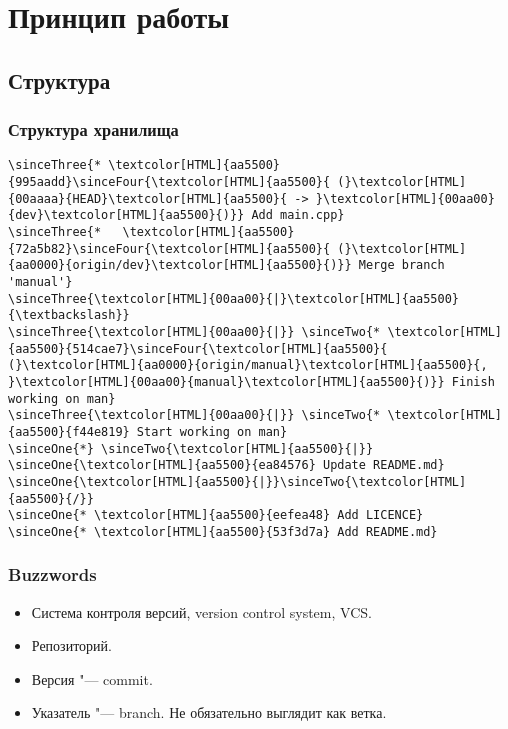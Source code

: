 \documentclass[pdf,russian]{beamer}
\begin{document}
\section{Принцип работы}

\subsection{Структура}

\begin{frame}[fragile]
    \frametitle{Структура хранилища}


    \newcommand{\sinceOne}[1]{\onslide<2->{#1}}
    \newcommand{\sinceTwo}[1]{\onslide<4->{#1}}
    \newcommand{\sinceThree}[1]{\onslide<6->{#1}}
    \newcommand{\sinceFour}[1]{\onslide<8->{#1}}

    \begin{block}{}
        \begin{Verbatim}[commandchars=\\\{\}]
\sinceThree{* \textcolor[HTML]{aa5500}{995aadd}\sinceFour{\textcolor[HTML]{aa5500}{ (}\textcolor[HTML]{00aaaa}{HEAD}\textcolor[HTML]{aa5500}{ -> }\textcolor[HTML]{00aa00}{dev}\textcolor[HTML]{aa5500}{)}} Add main.cpp}
\sinceThree{*   \textcolor[HTML]{aa5500}{72a5b82}\sinceFour{\textcolor[HTML]{aa5500}{ (}\textcolor[HTML]{aa0000}{origin/dev}\textcolor[HTML]{aa5500}{)}} Merge branch 'manual'}
\sinceThree{\textcolor[HTML]{00aa00}{|}\textcolor[HTML]{aa5500}{\textbackslash}}
\sinceThree{\textcolor[HTML]{00aa00}{|}} \sinceTwo{* \textcolor[HTML]{aa5500}{514cae7}\sinceFour{\textcolor[HTML]{aa5500}{ (}\textcolor[HTML]{aa0000}{origin/manual}\textcolor[HTML]{aa5500}{, }\textcolor[HTML]{00aa00}{manual}\textcolor[HTML]{aa5500}{)}} Finish working on man}
\sinceThree{\textcolor[HTML]{00aa00}{|}} \sinceTwo{* \textcolor[HTML]{aa5500}{f44e819} Start working on man}
\sinceOne{*} \sinceTwo{\textcolor[HTML]{aa5500}{|}} \sinceOne{\textcolor[HTML]{aa5500}{ea84576} Update README.md}
\sinceOne{\textcolor[HTML]{aa5500}{|}}\sinceTwo{\textcolor[HTML]{aa5500}{/}}
\sinceOne{* \textcolor[HTML]{aa5500}{eefea48} Add LICENCE}
\sinceOne{* \textcolor[HTML]{aa5500}{53f3d7a} Add README.md}
        \end{Verbatim}
    \end{block}
\end{frame}

\begin{frame}
    \frametitle{Buzzwords}
    \begin{itemize}
        \pause
        \item Система контроля версий, version control system, VCS.
        \pause
        \item Репозиторий.
        \pause
        \item Версия "--- commit.
        \pause
        \item Указатель "--- branch. \pause Не обязательно выглядит как ветка.
    \end{itemize}
\end{frame}
\end{document}
